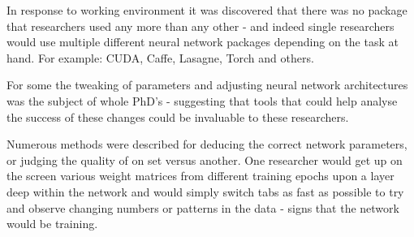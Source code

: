 \documentclass[a4paper,11pt,titlepage]{article}
\begin{document}
	\begin{figure}[H]
	\end{figure}
	
	In response to working environment it was discovered that there was no package that researchers used any more than any other - and indeed single researchers would use multiple different neural network packages depending on the task at hand. For example: CUDA, Caffe, Lasagne, Torch and others. 
	\par 
	
	\begin{figure}[H]
	\end{figure}
	
	For some the tweaking of parameters and adjusting neural network architectures was the subject of whole PhD's - suggesting that tools that could help analyse the success of these changes could be invaluable to these researchers. 
	\par 
	Numerous methods were described for deducing the correct network parameters, or judging the quality of on set versus another. One researcher would get up on the screen various weight matrices from different training epochs upon a layer deep within the network and would simply switch tabs as fast as possible to try and observe changing numbers or patterns in the data - signs that the network would be training. 
	\par 
	
\end{document}
